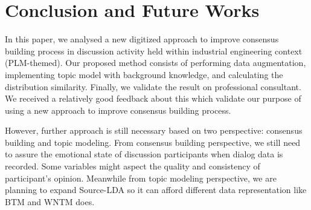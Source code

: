 \documentclass[10pt, conference, compsocconf]{IEEEtran}
\begin{document}
\section{Conclusion and Future Works}
In this paper, we analysed a new digitized approach to improve consensus building process in discussion activity held within industrial engineering context (PLM-themed). Our proposed method consists of performing data augmentation, implementing topic model with background knowledge, and calculating the distribution similarity. Finally, we validate the result on professional consultant. We received a relatively good feedback about this which validate our purpose of using a new approach to improve consensus building process.

However, further approach is still necessary based on two perspective: consensus building and topic modeling. From consensus building perspective, we still need to assure the emotional state of discussion participants when dialog data is recorded. Some variables might aspect the quality and consistency of participant's opinion. Meanwhile from topic modeling perspective, we are planning to expand Source-LDA so it can afford different data representation like BTM and WNTM does.
%
%

\end{document}
